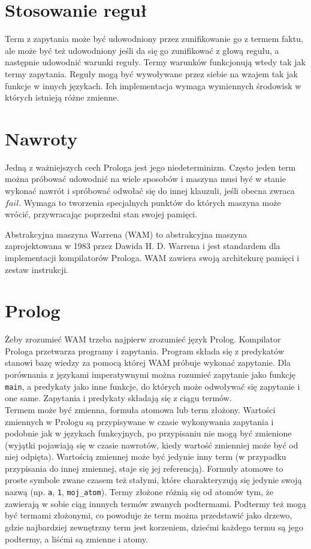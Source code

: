 \section{Stosowanie reguł}

Term z zapytania może być udowodniony przez zunifikowanie go z termem faktu, ale może być też udowodniony jeśli da się go zunifikować z głową regułu, a następnie udowodnić warunki reguły. Termy warunków funkcjonują wtedy tak jak termy zapytania. Reguły mogą być wywoływane przez siebie na wzajem tak jak funkcje w innych językach. Ich implementacja wymaga wymiennych środowisk w których istnieją różne zmienne.

\section{Nawroty}

Jedną z ważniejszych cech Prologa jest jego niedeterminizm. Często jeden term można próbować udowodnić na wiele sposobów i maszyna musi być w stanie wykonać nawrót i spróbować odwołać się do innej klauzuli, jeśli obecna zwraca $fail$. Wymaga to tworzenia specjalnych punktów do których maszyna może wrócić, przywracając poprzedni stan swojej pamięci.
\fi

Abstrakcyjna maszyna Warrena (WAM) to abstrakcyjna maszyna zaprojektowana w 1983 przez Dawida H. D. Warrena i jest standardem dla implementacji kompilatorów Prologa. WAM zawiera swoją architekurę pamięci i zestaw instrukcji.

\section{Prolog}

Żeby zrozumieć WAM trzeba najpierw zrozumieć język Prolog. Kompilator Prologa przetwarza programy i zapytania. Program składa się z predykatów stanowi bazę wiedzy za pomocą której WAM próbuje wykonać zapytanie. Dla porównania z językami imperatywnymi można rozumieć zapytanie jako funkcję \texttt{main}, a predykaty jako inne funkcje, do których może odwoływać się zapytanie i one same. Zapytania i predykaty składają się z ciągu termów.\\

Termem może być zmienna, formuła atomowa lub term złożony. Wartości zmiennych w Prologu są przypisywane w czasie wykonywania zapytania i podobnie jak w językach funkcyjnych, po przypisaniu nie mogą być zmienione (wyjątki pojawiają się w czasie nawrotów, kiedy wartość zmienniej może być od niej odpięta). Wartością zmiennej może być jedynie inny term (w przypadku przypisania do innej zmiennej, staje się jej referencją). Formuły atomowe to proste symbole zwane czasem też stałymi, które charakteryzują się jedynie swoją nazwą (np. \texttt{a}, \texttt{1}, \texttt{moj\_atom}). Termy złożone różnią się od atomów tym, że zawierają w sobie ciąg innnych termów zwanych podtermami. Podtermy też mogą być termami złożonymi, co powoduje że term można przedstawić jako drzewo, gdzie najbardziej zewnętrzny term jest korzeniem, dziećmi każdego termu są jego podtermy, a liśćmi są zmienne i atomy.\\

